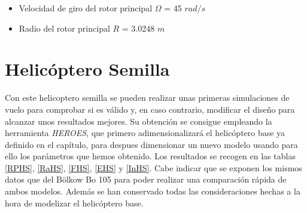 \begin{itemize}
	\item Velocidad de giro del rotor principal $\Omega$ = 45 $rad/s$
	\item Radio del rotor principal $R$ = 3.0248 $m$
\end{itemize}

\section{Helicóptero Semilla}

Con este helicoptero semilla se pueden realizar unas primeras simulaciones de vuelo para comprobar si es válido y, en caso contrario, modificar el diseño para alcanzar unos resultados mejores. Su obtención se consigue empleando la herramienta \emph{HEROES}, que primero adimensionalizará el helicóptero base ya definido en el capítulo, para despues dimensionar un nuevo modelo usando para ello los parámetros que hemos obtenido. Los resultados se recogen en las tablas \ref{RPHS}, \ref{RaHS}, \ref{FHS}, \ref{EHS} y \ref{InHS}.
Cabe indicar que se exponen los mismos datos que del Bölkow Bo 105 para poder realizar una comparación rápida de ambos modelos. Además se han conservado todas las consideraciones hechas a la hora de modelizar el helicóptero base.

